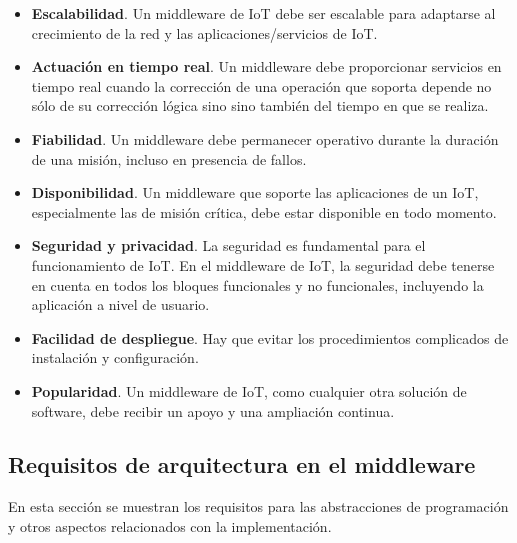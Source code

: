 {  \begin{itemize}
     \item \textbf{Escalabilidad}. Un middleware de IoT debe ser escalable para adaptarse al crecimiento de la red y las aplicaciones/servicios de IoT.
     \item \textbf{Actuación en tiempo real}. Un middleware debe proporcionar servicios en tiempo real cuando la corrección de una operación que soporta depende no sólo de su corrección lógica sino sino también del tiempo en que se realiza.
     \item \textbf{Fiabilidad}. Un middleware debe permanecer operativo durante la duración de una misión, incluso en presencia de fallos.
     \item \textbf{Disponibilidad}. Un middleware que soporte las aplicaciones de un IoT, especialmente las de misión crítica, debe estar disponible en todo momento.
     \item \textbf{Seguridad y privacidad}. La seguridad es fundamental para el funcionamiento de IoT. En el middleware de IoT, la seguridad debe tenerse en cuenta en todos los bloques funcionales y no funcionales, incluyendo la aplicación a nivel de usuario.
     \item \textbf{Facilidad de despliegue}. Hay que evitar los procedimientos complicados de instalación y configuración.
     \item \textbf{Popularidad}. Un middleware de IoT, como cualquier otra solución de software, debe recibir un apoyo y una ampliación continua.
 \end{itemize}
 
\subsection{Requisitos de arquitectura en el middleware}

En esta sección se muestran los requisitos para las abstracciones de programación y otros aspectos relacionados con la implementación.

}
